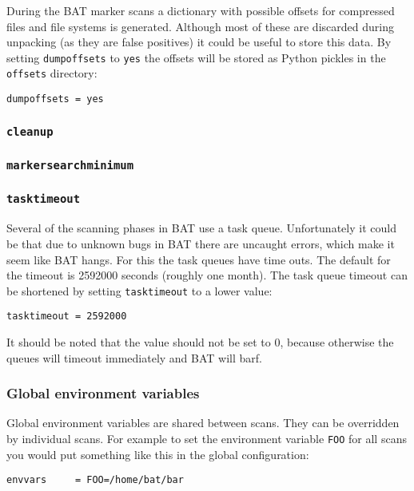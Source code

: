 \documentclass[10pt,a4paper]{article}
\begin{document}
During the BAT marker scans a dictionary with possible offsets for compressed
files and file systems is generated. Although most of these are discarded
during unpacking (as they are false positives) it could be useful to store this
data. By setting \texttt{dumpoffsets} to \texttt{yes} the offsets will be
stored as Python pickles in the \texttt{offsets} directory:

\begin{verbatim}
dumpoffsets = yes
\end{verbatim}

\subsubsection{\texttt{cleanup}}

\subsubsection{\texttt{markersearchminimum}}

\subsubsection{\texttt{tasktimeout}}

Several of the scanning phases in BAT use a task queue. Unfortunately it could
be that due to unknown bugs in BAT there are uncaught errors, which make it
seem like BAT hangs. For this the task queues have time outs. The default for
the timeout is 2592000 seconds (roughly one month). The task queue timeout can
be shortened by setting \texttt{tasktimeout} to a lower value:

\begin{verbatim}
tasktimeout = 2592000
\end{verbatim}

It should be noted that the value should not be set to 0, because otherwise
the queues will timeout immediately and BAT will barf.

\subsubsection{Global environment variables}

Global environment variables are shared between scans. They can be overridden
by individual scans. For example to set the environment variable \texttt{FOO}
for all scans you would put something like this in the global configuration:

\begin{verbatim}
envvars     = FOO=/home/bat/bar
\end{verbatim}
\end{document}
